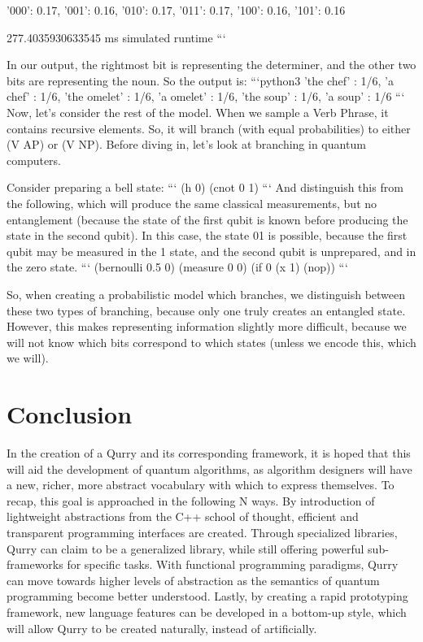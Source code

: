 \documentclass[journal]{IEEEtran}
\begin{document}
 {'000': 0.17, '001': 0.16, '010': 0.17, '011': 0.17, '100': 0.16, '101': 0.16}
 
 277.4035930633545 ms simulated runtime
 ```
 
 In our output, the rightmost bit is representing the determiner, and the other two bits are representing the noun.
 So the output is:
 ```python3
 {'the chef' : 1/6, 'a chef' : 1/6, 'the omelet' : 1/6, 'a omelet' : 1/6, 'the soup' : 1/6, 'a soup' : 1/6}
 ```
 Now, let's consider the rest of the model.
 When we sample a Verb Phrase, it contains recursive elements.
 So, it will branch (with equal probabilities) to either (V AP) or (V NP).
 Before diving in, let's look at branching in quantum computers.
 
 Consider preparing a bell state:
 ```
 (h 0)
 (cnot 0 1)
 ```
 And distinguish this from the following, which will produce the same classical measurements, but no entanglement (because the state of the first qubit is known before producing the state in the second qubit). 
 In this case, the state 01 is possible, because the first qubit may be measured in the 1 state, and the second qubit is unprepared, and in the zero state.
 ```
 (bernoulli 0.5 0)
 (measure 0 0)
 (if 0 (x 1) (nop))
 ```
 
 So, when creating a probabilistic model which branches, we distinguish between these two types of branching, because only one truly creates an entangled state.
 However, this makes representing information slightly more difficult, because we will not know which bits correspond to which states (unless we encode this, which we will).

\section{Conclusion}

In the creation of a Qurry and its corresponding framework, it is hoped that this will aid the development of quantum algorithms, as algorithm designers will have a new, richer, more abstract vocabulary with which to express themselves.
To recap, this goal is approached in the following N ways.
By introduction of lightweight abstractions from the C++ school of thought, efficient and transparent programming interfaces are created.
Through specialized libraries, Qurry can claim to be a generalized library, while still offering powerful sub-frameworks for specific tasks.
With functional programming paradigms, Qurry can move towards higher levels of abstraction as the semantics of quantum programming become better understood.
Lastly, by creating a rapid prototyping framework, new language features can be developed in a bottom-up style, which will allow Qurry to be created naturally, instead of artificially.
\end{document}
